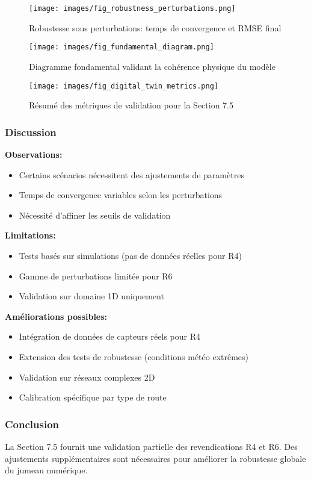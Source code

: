\begin{figure}[htbp]
\centering
\texttt{[image: images/fig\_robustness\_perturbations.png]}
\caption{Robustesse sous perturbations: temps de convergence et RMSE final}
\label{fig:robustness_perturbations}
\end{figure}

\begin{figure}[htbp]
\centering
\texttt{[image: images/fig\_fundamental\_diagram.png]}
\caption{Diagramme fondamental validant la cohérence physique du modèle}
\label{fig:fundamental_diagram}
\end{figure}

\begin{figure}[htbp]
\centering
\texttt{[image: images/fig\_digital\_twin\_metrics.png]}
\caption{Résumé des métriques de validation pour la Section 7.5}
\label{fig:digital_twin_metrics}
\end{figure}

\subsubsection{Discussion}


\textbf{Observations:}
\begin{itemize}
    \item Certains scénarios nécessitent des ajustements de paramètres
    \item Temps de convergence variables selon les perturbations
    \item Nécessité d'affiner les seuils de validation
\end{itemize}

\textbf{Limitations:}
\begin{itemize}
    \item Tests basés sur simulations (pas de données réelles pour R4)
    \item Gamme de perturbations limitée pour R6
    \item Validation sur domaine 1D uniquement
\end{itemize}

\textbf{Améliorations possibles:}
\begin{itemize}
    \item Intégration de données de capteurs réels pour R4
    \item Extension des tests de robustesse (conditions météo extrêmes)
    \item Validation sur réseaux complexes 2D
    \item Calibration spécifique par type de route
\end{itemize}

\subsubsection{Conclusion}

La Section 7.5 fournit une validation partielle des revendications R4 et R6. Des ajustements supplémentaires sont nécessaires pour améliorer la robustesse globale du jumeau numérique.
